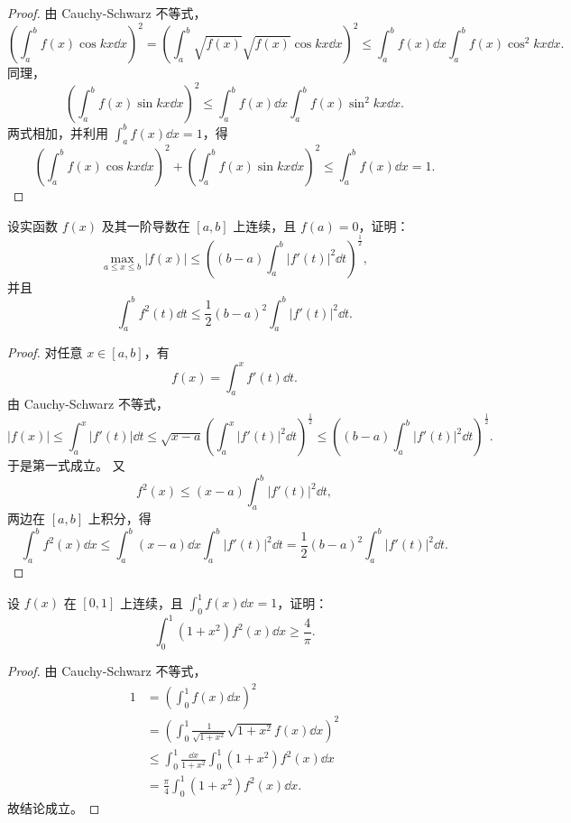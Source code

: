 \begin{proof}
	由 Cauchy-Schwarz 不等式，
	\[
	\left(\int_a^b f(x)\cos kx\dd x\right)^2
	=\left(\int_a^b \sqrt{f(x)}\sqrt{f(x)}\cos kx\dd x\right)^2
	\leqslant \int_a^b f(x)\dd x\int_a^b f(x)\cos^2kx\dd x.
	\]
	同理，
	\[
	\left(\int_a^b f(x)\sin kx\dd x\right)^2
	\leqslant \int_a^b f(x)\dd x\int_a^b f(x)\sin^2kx\dd x.
	\]
	两式相加，并利用 $\displaystyle\int_a^b f(x)\dd x=1$，得
	\[
	\left(\int_a^b f(x)\cos kx\dd x\right)^2+
	\left(\int_a^b f(x)\sin kx\dd x\right)^2
	\leqslant \int_a^b f(x)\dd x=1.
	\]
\end{proof}

\begin{problem}
	设实函数 $f(x)$ 及其一阶导数在 $[a,b]$ 上连续，且 $f(a)=0$，证明：
	\[
	\max_{a\leqslant x\leqslant b}|f(x)|
	\leqslant \left((b-a)\int_a^b |f'(t)|^2\dd t\right)^{\frac12},
	\]
	并且
	\[
	\int_a^b f^2(t)\dd t
	\leqslant \frac12(b-a)^2\int_a^b |f'(t)|^2\dd t.
	\]
\end{problem}

\begin{proof}
	对任意 $x\in[a,b]$，有
	\[
	f(x)=\int_a^x f'(t)\dd t.
	\]
	由 Cauchy-Schwarz 不等式，
	\[
	|f(x)|\leqslant \int_a^x |f'(t)|\dd t
	\leqslant \sqrt{x-a}\left(\int_a^x |f'(t)|^2\dd t\right)^{\frac12}
	\leqslant \left((b-a)\int_a^b |f'(t)|^2\dd t\right)^{\frac12}.
	\]
	于是第一式成立。
	又
	\[
	f^2(x)\leqslant (x-a)\int_a^b |f'(t)|^2\dd t,
	\]
	两边在 $[a,b]$ 上积分，得
	\[
	\int_a^b f^2(x)\dd x
	\leqslant \int_a^b (x-a)\dd x\int_a^b |f'(t)|^2\dd t
	=\frac12(b-a)^2\int_a^b |f'(t)|^2\dd t.
	\]
\end{proof}

\begin{problem}
	设 $f(x)$ 在 $[0,1]$ 上连续，且 $\displaystyle\int_0^1 f(x)\dd x=1$，证明：
	\[
	\int_0^1 (1+x^2)f^2(x)\dd x\geqslant \frac4\pi.
	\]
\end{problem}

\begin{proof}
	由 Cauchy-Schwarz 不等式，
	\[
	\begin{aligned}
		1
		&=\left(\int_0^1 f(x)\dd x\right)^2  \\
		&=\left(\int_0^1 \frac1{\sqrt{1+x^2}}\sqrt{1+x^2}f(x)\dd x\right)^2 \\
		&\leqslant \int_0^1\frac{\dd x}{1+x^2}\int_0^1(1+x^2)f^2(x)\dd x \\
		&=\frac\pi4\int_0^1(1+x^2)f^2(x)\dd x.
	\end{aligned}
	\]
	故结论成立。
\end{proof}

